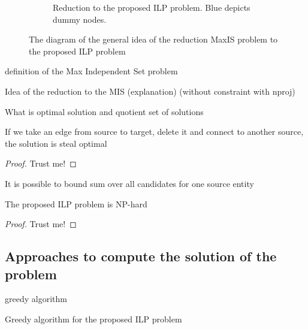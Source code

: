 \begin{figure}[ht]
\begin{subfigure}{.5\textwidth}
        \caption{Reduction to the proposed ILP problem. \textcolor{blue!60}{Blue} depicts dummy nodes.}
    \end{subfigure}
    \caption{The diagram of the general idea of the reduction MaxIS problem to the proposed ILP problem}
\end{figure}

definition of the Max Independent Set problem

Idea of the reduction to the MIS (explanation) (without constraint with nproj)

What is optimal solution and quotient set of solutions

\begin{lemma}
    If we take an edge from source to target, delete it and connect to another source, the solution is steal optimal
\end{lemma}
\begin{proof}
    Trust me!
\end{proof}

\begin{corollary}
    It is possible to bound sum over all candidates for one source entity
\end{corollary}

\begin{theorem}[]
    The proposed ILP problem is NP-hard
\end{theorem}
\begin{proof}
    Trust me!
\end{proof}


\subsection{Approaches to compute the solution of the problem}
greedy algorithm
\begin{algorithm}
    \caption{Greedy algorithm for the proposed ILP problem} \label{alg:ilp_greedy}
\end{algorithm}